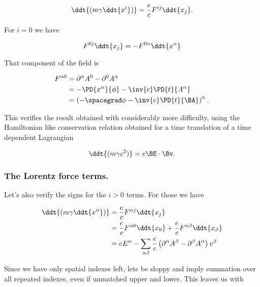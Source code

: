 \begin{equation}\label{eqn:lorentzForceHamiltonian:310}
\ddt{(m \gamma \ddt{x^i})} = \frac{e}{c} F^{ij} \ddt{x_j}.
\end{equation}

For $i=0$ we have

\begin{equation}\label{eqn:lorentzForceHamiltonian:320}
F^{0j} \ddt{x_j} 
= -F^{0\alpha} \ddt{x^\alpha} 
\end{equation}

That component of the field is

\begin{align*}
F^{\alpha 0} 
&=
\partial^\alpha A^0 - \partial^0 A^\alpha \\
&=
-\PD{x^\alpha}{\phi} - \inv{c} \PD{t}{A^\alpha} \\
&= \left( -\spacegrad \phi - \inv{c} \PD{t}{\BA} \right)^\alpha.
\end{align*}

This verifies the result obtained with considerably more difficulty, using the Hamiltonian like conservation relation obtained for a time translation of a time dependent Lagrangian

\begin{equation}\label{eqn:lorentzForceHamiltonian:330}
\ddt{(m \gamma c^2 )} = e \BE \cdot \Bv.
\end{equation}

\subsubsection{The Lorentz force terms.}

Let's also verify the signs for the $i > 0$ terms.  For those we have

\begin{align*}
\ddt{(m \gamma \ddt{x^\alpha})} 
&= \frac{e}{c} F^{\alpha j} \ddt{x_j} \\
&= 
\frac{e}{c} F^{\alpha 0} \ddt{x_0}
+\frac{e}{c} F^{\alpha \beta} \ddt{x_\beta} \\
&= 
e E^\alpha
- \sum_{\alpha \beta} \frac{e}{c} \left( \partial^\alpha A^\beta - \partial^\beta A^\alpha
\right)
v^\beta \\
\end{align*}

Since we have only spatial indexes left, lets be sloppy and imply summation over all repeated indexes, even if unmatched upper and lower.  This leaves us with

